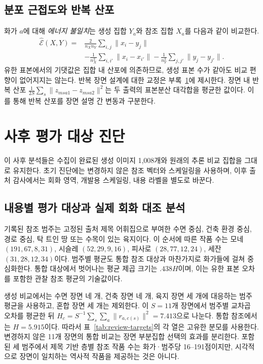 \documentclass[11pt,a4paper]{article}
\newcommand{\E}{\widehat{\mathcal E}}
\begin{document}
\subsection{분포 근접도와 반복 산포}
화가 $a$에 대해 \emph{에너지 불일치}는 생성 집합 $Y_a$와 참조 집합 $X_a$를 다음과 같이 비교한다.
\begin{equation}
\begin{split}
 \E(X,Y)={}&\frac{2}{n_Xn_Y}\sum_{i,j}\|x_i-y_j\|\\
 &-\frac1{n_X^2}\sum_{i,i'}\|x_i-x_{i'}\|
 -\frac1{n_Y^2}\sum_{j,j'}\|y_j-y_{j'}\|.
\end{split}
 \label{eq:energy}
\end{equation}
유한 표본에서의 기댓값은 집합 내 산포에 의존하므로, 생성 표본 수가 같아도 비교 편향이 없어지지는 않는다. 반복 장면 설계에 대한 교정은 부록~\ref{app:diagnostics}에 제시한다. 장면 내 반복 산포 $\frac1{2S}\sum_s\|z_{msa1}-z_{msa2}\|^2$는 두 출력의 표본분산 대각합을 평균한 값이다. 이를 통해 반복 산포를 장면 설명 간 변동과 구분한다.

\section{사후 평가 대상 진단}\label{app:diagnostics}
이 사후 분석들은 수집이 완료된 생성 이미지 1,008개와 원래의 추론 비교 집합을 그대로 유지한다. 초기 진단에는 변경하지 않은 참조 벡터와 스케일링을 사용하며, 이후 출처 감사에서는 회화 영역, 개발용 스케일링, 내용 라벨을 별도로 바꾼다.

\subsection{내용별 평가 대상과 실제 회화 대조 분석}
기록된 참조 범주는 고정된 출처 제목 어휘집으로 부여한 수면 중심, 건축 환경 중심, 경로 중심, 탁 트인 땅 또는 수목이 있는 육지이다. 이 순서에 따른 작품 수는 모네 $(191,67,8,31)$, 시슬레 $(52,29,9,16)$, 피사로 $(28,77,12,24)$, 세잔 $(31,28,12,34)$이다. 범주별 평균도 통합 참조 대상과 마찬가지로 화가들에 걸쳐 중심화한다. 통합 대상에서 벗어나는 평균 제곱 크기는 $.438H$이며, 이는 유한 표본 오차를 포함한 관찰 참조 평균의 기술값이다.

생성 비교에서는 수면 장면 네 개, 건축 장면 네 개, 육지 장면 세 개에 대응하는 범주 평균을 사용하고, 혼합 장면 세 개는 제외한다. 이 $S=11$개 장면에서 범주별 교차곱 오차를 평균한 뒤 $H_c=S^{-1}\sum_s\sum_a\|r_{a,c(s)}\|^2=7.413$으로 나눈다. 통합 참조에서는 $H=5.915$이다. 따라서 표~\ref{tab:review-targets}의 각 열은 고유한 분모를 사용한다. 변경하지 않은 11개 장면의 통합 비교는 장면 부분집합 선택의 효과를 분리한다. 포함된 세 범주에서 제목 기반 층별 참조 작품 수는 화가·범주당 16--191점이지만, 시각적으로 장면이 일치하는 역사적 작품을 제공하는 것은 아니다.
\end{document}
